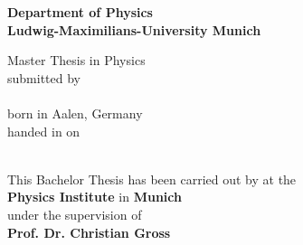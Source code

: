 \begin{titlepage}
\begin{center}
\makeatletter

\Large\textbf{Department of Physics\\
Ludwig-Maximilians-University Munich}

\vfill

\normalsize
Master Thesis in Physics\\
\normalsize
submitted by\\[0.5cm]
\Large
\textbf{\@author}\\
\normalsize
born in Aalen, Germany\\[0.5cm]
\normalsize
handed in on\\
\Large
\textbf{\@date}\\[0.5cm]
\normalsize


\cleardoublepage
\thispagestyle{empty}


\LARGE\textbf{\@title}

\vfill

\normalsize
This Bachelor Thesis has been carried out by \@author{} at the\\
\textbf{Physics Institute} in \textbf{Munich}\\
under the supervision of\\
\textbf{Prof. Dr. Christian Gross}

\makeatother
\end{center}
\end{titlepage}
